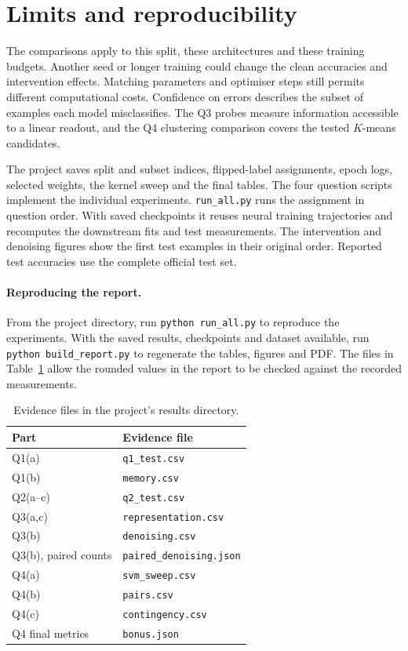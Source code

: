 \documentclass[10pt,twocolumn,letterpaper]{article}
\newcommand{\tbl}[3]{%
  \begin{table}[H]
    \centering
    \caption{#1}
    \label{#2}
    \small
    #3
  \end{table}
}
\begin{document}
\ClusterFindings{}

\OverlapFindings{}

\section{Limits and reproducibility}

The comparisons apply to this split, these architectures and these
training budgets. Another seed or longer training could change the
clean accuracies and intervention effects. Matching parameters and
optimiser steps still permits different computational costs. Confidence
on errors describes the subset of examples each model misclassifies.
The Q3 probes measure information accessible to a linear readout, and
the Q4 clustering comparison covers the tested $K$-means candidates.

The project saves split and subset indices, flipped-label assignments,
epoch logs, selected weights, the kernel sweep and the final tables.
The four question scripts implement the individual experiments.
\texttt{run\_all.py} runs the assignment in question order. With saved
checkpoints it reuses neural training trajectories and recomputes the
downstream fits and test measurements. The intervention and denoising
figures show the first test examples in their original order. Reported
test accuracies use the complete official test set.

\paragraph{Reproducing the report.}
From the project directory, run \texttt{python run\_all.py} to reproduce
the experiments. With the saved results, checkpoints and dataset
available, run \texttt{python build\_report.py} to regenerate the
tables, figures and PDF. The files in Table~\ref{tab:audit} allow
the rounded values in the report to be checked against the recorded
measurements.

\tbl{Evidence files in the project's results directory.}{tab:audit}{
\begin{tabular}{ll}
\toprule
Part & Evidence file\\
\midrule
Q1(a) & \texttt{q1\_test.csv}\\
Q1(b) & \texttt{memory.csv}\\
Q2(a--c) & \texttt{q2\_test.csv}\\
Q3(a,c) & \texttt{representation.csv}\\
Q3(b) & \texttt{denoising.csv}\\
Q3(b), paired counts & \texttt{paired\_denoising.json}\\
Q4(a) & \texttt{svm\_sweep.csv}\\
Q4(b) & \texttt{pairs.csv}\\
Q4(c) & \texttt{contingency.csv}\\
Q4 final metrics & \texttt{bonus.json}\\
\bottomrule
\end{tabular}}
\end{document}

